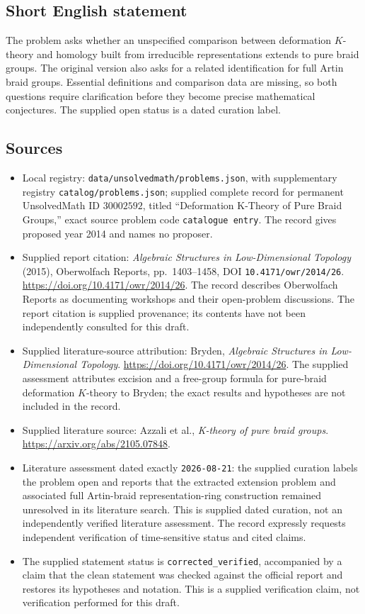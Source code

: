 \documentclass[11pt]{article}
\begin{document}
\subsection{Short English statement}
The problem asks whether an unspecified comparison between deformation \(K\)-theory and homology built from irreducible representations extends to pure braid groups. The original version also asks for a related identification for full Artin braid groups. Essential definitions and comparison data are missing, so both questions require clarification before they become precise mathematical conjectures. The supplied open status is a dated curation label.
\subsection{Sources}
\begin{itemize}
\item Local registry: \texttt{data/unsolvedmath/problems.json}, with supplementary registry \texttt{catalog/problems.json}; supplied complete record for permanent UnsolvedMath ID \(30002592\), titled ``Deformation K-Theory of Pure Braid Groups,'' exact source problem code \texttt{catalogue entry}. The record gives proposed year 2014 and names no proposer.
\item Supplied report citation: \emph{Algebraic Structures in Low-Dimensional Topology} (2015), Oberwolfach Reports, pp.~1403--1458, DOI \texttt{10.4171/owr/2014/26}. \url{https://doi.org/10.4171/owr/2014/26}. The record describes Oberwolfach Reports as documenting workshops and their open-problem discussions. The report citation is supplied provenance; its contents have not been independently consulted for this draft.
\item Supplied literature-source attribution: Bryden, \emph{Algebraic Structures in Low-Dimensional Topology}. \url{https://doi.org/10.4171/owr/2014/26}. The supplied assessment attributes excision and a free-group formula for pure-braid deformation \(K\)-theory to Bryden; the exact results and hypotheses are not included in the record.
\item Supplied literature source: Azzali et al., \emph{K-theory of pure braid groups}. \url{https://arxiv.org/abs/2105.07848}.
\item Literature assessment dated exactly \texttt{2026-08-21}: the supplied curation labels the problem open and reports that the extracted extension problem and associated full Artin-braid representation-ring construction remained unresolved in its literature search. This is supplied dated curation, not an independently verified literature assessment. The record expressly requests independent verification of time-sensitive status and cited claims.
\item The supplied statement status is \texttt{corrected\_verified}, accompanied by a claim that the clean statement was checked against the official report and restores its hypotheses and notation. This is a supplied verification claim, not verification performed for this draft.
\end{itemize}
\end{document}
